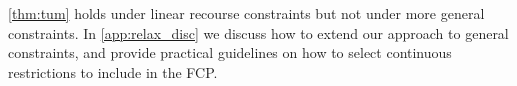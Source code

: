 
\cref{thm:tum} holds under linear recourse constraints
but not under more general constraints. 
In \cref{app:relax_disc} we discuss how to extend our approach to general constraints, and provide practical guidelines on how to select continuous restrictions to include in the FCP.
